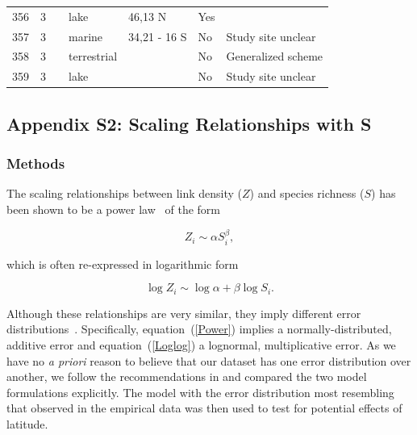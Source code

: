 \documentclass[12pt]{article}
\begin{document}
\begin{landscape}
\begin{table}[h!]
{\begin{tabular}{p{2.8cm}p{1.3cm}p{5.5cm}p{2.2cm}p{2.5cm}lp{3.5cm}}
        356   & 3 & \citet{Cohen2003}    & lake  & 46,13 N & Yes   &       \\
        357   & 3 & \citet{Yodzis1998} & marine & 34,21 - 16 S & No    & Study site unclear \\
        358   & 3 & \citet{Schroter2003}  & terrestrial &       & No    & Generalized scheme \\
        359   & 3 & \citet{Baiser2012}  & lake  &       & No    & Study site unclear \\
        \hline
      \end{tabular}%
        }
    \end{table}%

  \end{landscape}
\newpage

\subsection*{Appendix S2: Scaling Relationships with S}

  \subsubsection*{Methods}

    The scaling relationships between link density ($Z$) and species richness ($S$)
    has been shown to be a power law~\citep{Riede2010} of the form 

    \begin{equation}
    \label{Power}
    Z_{i} \sim \alpha S_{i}^{\beta}  ,
    \end{equation}

    \noindent which is often re-expressed in logarithmic form 

    \begin{equation}
    \label{Loglog}
    \log{Z_{i}} \sim \log{\alpha} + \beta\log{S_{i}}  .
    \end{equation}

    \noindent Although these relationships are very similar, they imply different error distributions~\citep{Xiao2011}.
    Specifically, equation~(\ref{Power}) implies a normally-distributed, additive error and equation~(\ref{Loglog}) a lognormal,
    multiplicative error. As we have no \emph{a priori} reason to believe that our dataset has one error distribution
    over another, we follow the recommendations in\citet{Xiao2011} and compared the two
    model formulations explicitly. The model with the error distribution most resembling that observed in the empirical
    data was then used to test for potential effects of latitude.
\end{document}
